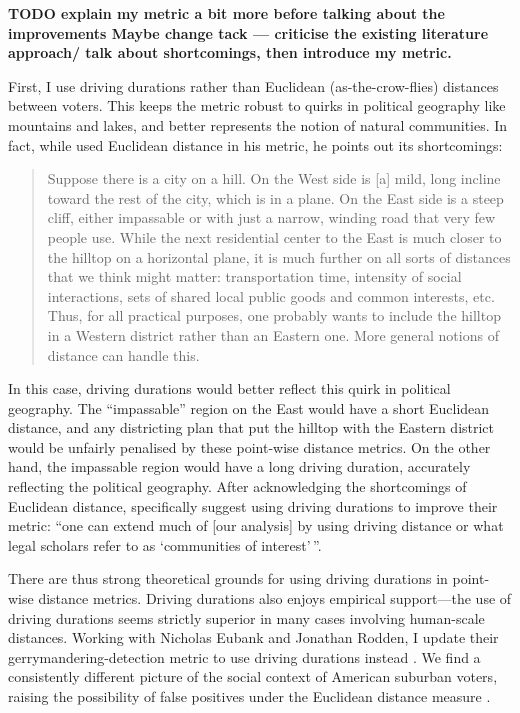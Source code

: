 \documentclass[]{article}
\begin{document}
\textbf{TODO explain my metric a bit more before talking about the
improvements Maybe change tack --- criticise the existing literature
approach/ talk about shortcomings, then introduce my metric.}

First, I use driving durations rather than Euclidean (as-the-crow-flies)
distances between voters. This keeps the metric robust to quirks in
political geography like mountains and lakes, and better represents the
notion of natural communities. In fact, while \cite{fh2011} used
Euclidean distance in his metric, he points out its shortcomings:

\begin{quote}
Suppose there is a city on a hill. On the West side is {[}a{]} mild,
long incline toward the rest of the city, which is in a plane. On the
East side is a steep cliff, either impassable or with just a narrow,
winding road that very few people use. While the next residential center
to the East is much closer to the hilltop on a horizontal plane, it is
much further on all sorts of distances that we think might matter:
transportation time, intensity of social interactions, sets of shared
local public goods and common interests, etc. Thus, for all practical
purposes, one probably wants to include the hilltop in a Western
district rather than an Eastern one. More general notions of distance
can handle this.
\end{quote}

In this case, driving durations would better reflect this quirk in
political geography. The ``impassable'' region on the East would have a
short Euclidean distance, and any districting plan that put the hilltop
with the Eastern district would be unfairly penalised by these
point-wise distance metrics. On the other hand, the impassable region
would have a long driving duration, accurately reflecting the political
geography. After acknowledging the shortcomings of Euclidean distance,
\citeauthor{fh2011} specifically suggest using driving durations to
improve their metric: ``one can extend much of {[}our analysis{]} by
using driving distance or what legal scholars refer to as `communities
of interest'\,''.

There are thus strong theoretical grounds for using driving durations in
point-wise distance metrics. Driving durations also enjoys empirical
support---the use of driving durations seems strictly superior in many
cases involving human-scale distances. Working with Nicholas Eubank and
Jonathan Rodden, I update their gerrymandering-detection metric to use
driving durations instead \citep{er2019}. We find a consistently
different picture of the social context of American suburban voters,
raising the possibility of false positives under the Euclidean distance
measure \citep*{elrwp}.
\end{document}

